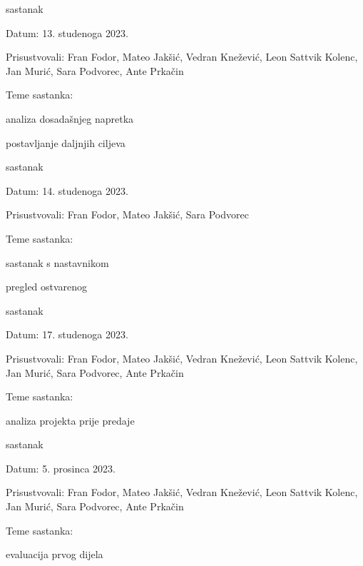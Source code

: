 \begin{packed_enum}
			\item  sastanak
			\item[] \begin{packed_item}
				\item Datum: {13. studenoga 2023.}
				\item Prisustvovali: {Fran Fodor, Mateo Jakšić, Vedran Knežević, Leon Sattvik Kolenc, Jan Murić, Sara Podvorec, Ante Prkačin}
				\item Teme sastanka:
				\begin{packed_item}
					\item  analiza dosadašnjeg napretka
					\item  postavljanje daljnjih ciljeva
				\end{packed_item}
			\end{packed_item}

			\item  sastanak
			\item[] \begin{packed_item}
				\item Datum: {14. studenoga 2023.}
				\item Prisustvovali: {Fran Fodor, Mateo Jakšić, Sara Podvorec}
				\item Teme sastanka:
				\begin{packed_item}
					\item  sastanak s nastavnikom
					\item  pregled ostvarenog
				\end{packed_item}
			\end{packed_item}

			\item  sastanak
			\item[] \begin{packed_item}
				\item Datum: {17. studenoga 2023.}
				\item Prisustvovali: {Fran Fodor, Mateo Jakšić, Vedran Knežević, Leon Sattvik Kolenc, Jan Murić, Sara Podvorec, Ante Prkačin}
				\item Teme sastanka:
				\begin{packed_item}
					\item  analiza projekta prije predaje
				\end{packed_item}
			\end{packed_item}


			\item  sastanak
			\item[] \begin{packed_item}
				\item Datum: {5. prosinca 2023.}
				\item Prisustvovali: {Fran Fodor, Mateo Jakšić, Vedran Knežević, Leon Sattvik Kolenc, Jan Murić, Sara Podvorec, Ante Prkačin}
				\item Teme sastanka:
				\begin{packed_item}
					\item  evaluacija prvog dijela
				\end{packed_item}
			\end{packed_item}


\end{packed_enum}
